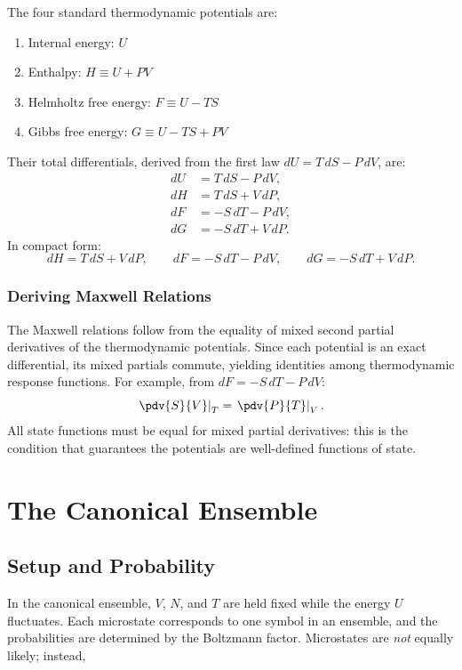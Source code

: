 The four standard thermodynamic potentials are:
\begin{enumerate}
    \item Internal energy: $U$
    \item Enthalpy: $H \equiv U + PV$
    \item Helmholtz free energy: $F \equiv U - TS$
    \item Gibbs free energy: $G \equiv U - TS + PV$
\end{enumerate}

Their total differentials, derived from the first law $dU = T\,dS - P\,dV$, are:
\begin{align}
    dU &= T\,dS - P\,dV, \\
    dH &= T\,dS + V\,dP, \\
    dF &= -S\,dT - P\,dV, \\
    dG &= -S\,dT + V\,dP.
\end{align}
In compact form:
\begin{equation}
    dH = T\,dS + V\,dP, \qquad dF = -S\,dT - P\,dV, \qquad dG = -S\,dT + V\,dP.
\end{equation}

\subsection{Deriving Maxwell Relations}

The Maxwell relations follow from the equality of mixed second partial derivatives of the thermodynamic potentials. Since each potential is an exact differential, its mixed partials commute, yielding identities among thermodynamic response functions. For example, from $dF = -S\,dT - P\,dV$:
\begin{equation}
    \left.\pdv{S}{V}\right|_T = \left.\pdv{P}{T}\right|_V.
\end{equation}
All state functions must be equal for mixed partial derivatives: this is the condition that guarantees the potentials are well-defined functions of state.

\chapter{The Canonical Ensemble}

\section{Setup and Probability}

In the canonical ensemble, $V$, $N$, and $T$ are held fixed while the energy $U$ fluctuates. Each microstate corresponds to one symbol in an ensemble, and the probabilities are determined by the Boltzmann factor. Microstates are \emph{not} equally likely; instead,

